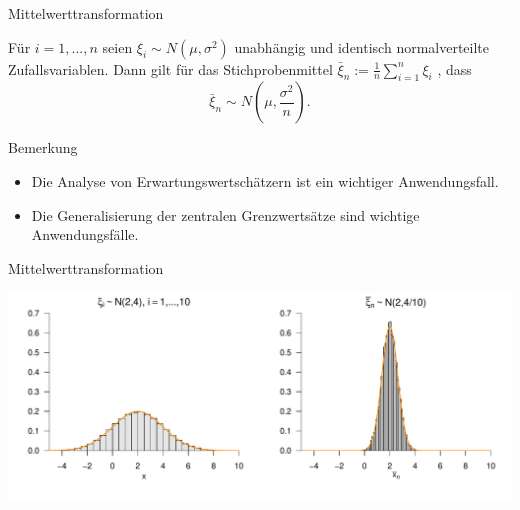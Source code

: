\documentclass[
  8pt,
  ignorenonframetext,
]{beamer}
\providecommand{\tightlist}{%
  \setlength{\itemsep}{0pt}\setlength{\parskip}{0pt}}
\begin{document}
\begin{frame}{Mittelwerttransformation}
\protect\hypertarget{mittelwerttransformation}{}
\small
\begin{theorem}
\justifying
\normalfont
Für $i = 1,...,n$ seien $\xi_i \sim N(\mu,\sigma^2)$ unabhängig und identisch
normalverteilte Zufallsvariablen. Dann gilt für das Stichprobenmittel
$\bar{\xi}_n := \frac{1}{n}\sum_{i=1}^n \xi_i$ , dass
\begin{equation}
\bar{\xi}_n \sim N\left(\mu, \frac{\sigma^2}{n}\right).
\end{equation}
\end{theorem}

Bemerkung

\begin{itemize}
\tightlist
\item
  Die Analyse von Erwartungswertschätzern ist ein wichtiger
  Anwendungsfall.
\item
  Die Generalisierung der zentralen Grenzwertsätze sind wichtige
  Anwendungsfälle.
\end{itemize}
\end{frame}

\begin{frame}{Mittelwerttransformation}
\protect\hypertarget{mittelwerttransformation-1}{}
\vfill
\center

\begin{center}\includegraphics[width=1\linewidth]{8_Abbildungen/wtfi_8_mittelwert} \end{center}
\vfill
\end{frame}
\end{document}
